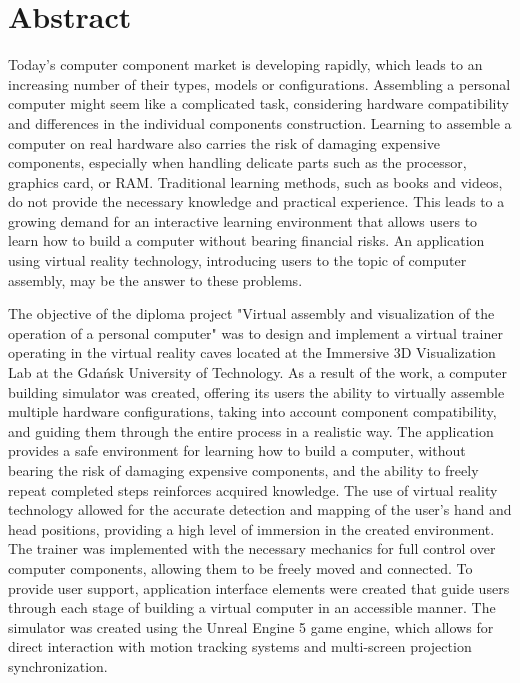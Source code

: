 \chapter*{Abstract}

Today's computer component market is developing rapidly, which leads to an increasing number of their types, models or configurations.
Assembling a personal computer might seem like a complicated task, considering hardware compatibility and differences in the individual components construction.
Learning to assemble a computer on real hardware also carries the risk of damaging expensive components, especially when handling delicate parts such as the processor, graphics card, or RAM.
Traditional learning methods, such as books and videos, do not provide the necessary knowledge and practical experience.
This leads to a growing demand for an interactive learning environment that allows users to learn how to build a computer without bearing financial risks.
An application using virtual reality technology, introducing users to the topic of computer assembly, may be the answer to these problems.

The objective of the diploma project "Virtual assembly and visualization of the operation of a personal computer" was to design and implement a virtual trainer operating in the virtual reality caves located at the Immersive 3D Visualization Lab at the Gdańsk University of Technology.
As a result of the work, a computer building simulator was created, offering its users the ability to virtually assemble multiple hardware configurations, taking into account component compatibility, and guiding them through the entire process in a realistic way.
The application provides a safe environment for learning how to build a computer, without bearing the risk of damaging expensive components, and the ability to freely repeat completed steps reinforces acquired knowledge.
The use of virtual reality technology allowed for the accurate detection and mapping of the user's hand and head positions, providing a high level of immersion in the created environment.
The trainer was implemented with the necessary mechanics for full control over computer components, allowing them to be freely moved and connected.
To provide user support, application interface elements were created that guide users through each stage of building a virtual computer in an accessible manner.
The simulator was created using the Unreal Engine 5 game engine, which allows for direct interaction with motion tracking systems and multi-screen projection synchronization.


